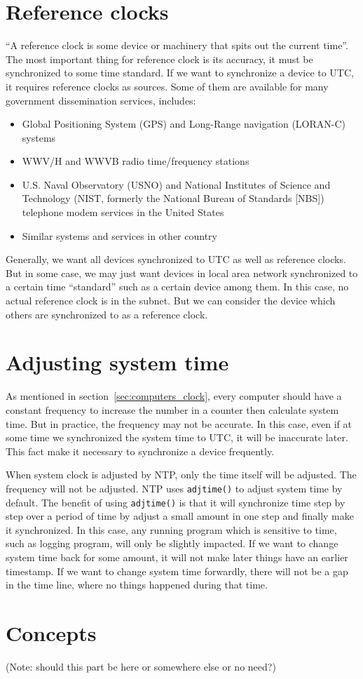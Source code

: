 \section{Reference clocks}%
\label{sec:reference_clocks}
``A reference clock is some device or machinery that spits out the current
time''. 
The most important thing for reference clock is its accuracy, it must be
synchronized to some time standard. If we want to synchronize a device to UTC,
it requires reference clocks as sources. Some of them are available for many
government dissemination services, includes:
\begin{itemize}
    \item Global Positioning System (GPS) and Long-Range navigation (LORAN-C)
        systems
    \item WWV/H and WWVB radio time/frequency stations
    \item U.S. Naval Observatory (USNO) and National Institutes of Science and
        Technology (NIST\null, formerly the National Bureau of Standards [NBS])
        telephone modem services in the United States
    \item Similar systems and services in other country
\end{itemize}
Generally, we want all devices synchronized to UTC as well as reference clocks.
But in some case, we may just want devices in local area network synchronized
to a certain time ``standard'' such as a certain device among them. In this
case, no actual reference clock is in the subnet. But we can consider the
device which others are synchronized to as a reference clock. 

\section{Adjusting system time}%
\label{sec:adjusting_system_time}
As mentioned in section~\ref{sec:computers_clock}, every computer should have
a constant frequency to increase the number in a counter then calculate system
time. But in practice, the frequency may not be accurate. In this case, even if
at some time we synchronized the system time to UTC, it will be inaccurate
later. This fact make it necessary to synchronize a device frequently.

When system clock is adjusted by NTP, only the time itself will be adjusted.
The frequency will not be adjusted. NTP uses \verb|adjtime()| to adjust system
time by default. The benefit of using \verb|adjtime()| is that it will
synchronize time step by step over a period of time by adjust a small amount in
one step and finally make it synchronized. In this case, any running program
which is sensitive to time, such as logging program, will only be slightly
impacted. If we want to change system time back for some amount, it will not
make later things have an earlier timestamp. If we want to change system time
forwardly, there will not be a gap in the time line, where no things happened
during that time.

\section{Concepts}%
\label{sec:concepts}

(Note: should this part be here or somewhere else or no need?)


